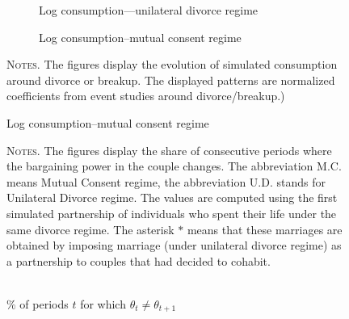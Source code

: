 \documentclass[12pt]{article}
\numberwithin{table}{section}
\begin{document}
\begin{figure}[ht]
	\caption{\\ Event studies of log consumption around divorce--simulated data}
	\label{fig:divcons}
		
	
	\begin{subfigure}{.49\textwidth}
		\centering
		\caption{Log consumption---unilateral divorce regime}
		\label{sf:cdivbil}
		\scalebox{0.5}{ } 
	\end{subfigure}
	\begin{subfigure}{.49\textwidth}
		\centering
		\caption{Log consumption--mutual consent regime}
		\label{sf:cdivuni}
		\scalebox{0.5}{ } 
	\end{subfigure}
	
	\hspace{20em}
	

	\begin{minipage}{0.99\textwidth} %
		
		\hspace{50em}
		
		{\footnotesize \textsc{Notes.} The figures display the evolution of simulated consumption around divorce or breakup. The displayed patterns are normalized coefficients from event studies around divorce/breakup.)\par}
	\end{minipage}
\end{figure}
\FloatBarrier

\begin{figure}[h!]
	\centering
	\caption{\\$\%$ of periods $t$ for which $\theta_t\neq \theta_{t+1}$}
	\vspace*{-0.5cm} 
	\hspace*{-1.3cm} 
	\label{fig:thch}
	\resizebox{0.8\textwidth}{!}{}
		\hspace{20em}	
	\begin{minipage}{0.99\textwidth} %
		{\footnotesize \textsc{Notes.} The figures display the share of consecutive periods where the bargaining power in the couple changes. The abbreviation M.C. means Mutual Consent regime, the abbreviation U.D. stands for Unilateral Divorce regime. The values are computed using the first simulated partnership of individuals who spent their life under the same divorce regime. The asterisk $*$ means that these marriages are obtained by imposing marriage (under unilateral divorce regime) as a partnership to couples that had decided to cohabit.\par}
	\end{minipage}
\end{figure}
\end{document}
